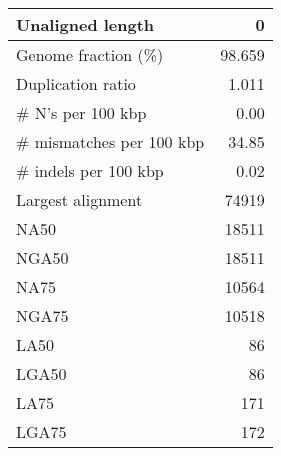 \documentclass[12pt,a4paper]{article}
\begin{document}
\begin{table}[ht]
\begin{center}
\begin{tabular}{|l*{1}{|r}|}
Unaligned length & 0 \\ \hline
Genome fraction (\%) & 98.659 \\ \hline
Duplication ratio & 1.011 \\ \hline
\# N's per 100 kbp & 0.00 \\ \hline
\# mismatches per 100 kbp & 34.85 \\ \hline
\# indels per 100 kbp & 0.02 \\ \hline
Largest alignment & 74919 \\ \hline
NA50 & 18511 \\ \hline
NGA50 & 18511 \\ \hline
NA75 & 10564 \\ \hline
NGA75 & 10518 \\ \hline
LA50 & 86 \\ \hline
LGA50 & 86 \\ \hline
LA75 & 171 \\ \hline
LGA75 & 172 \\ \hline
\end{tabular}
\end{center}
\end{table}
\end{document}
